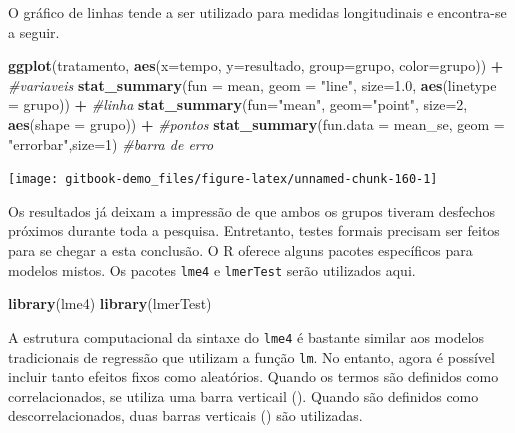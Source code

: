 \documentclass[
]{book}
\newenvironment{Shaded}{\begin{snugshade}}{\end{snugshade}}
\newcommand{\CommentTok}[1]{\textcolor[rgb]{0.56,0.35,0.01}{\textit{#1}}}
\newcommand{\DataTypeTok}[1]{\textcolor[rgb]{0.13,0.29,0.53}{#1}}
\newcommand{\DecValTok}[1]{\textcolor[rgb]{0.00,0.00,0.81}{#1}}
\newcommand{\FloatTok}[1]{\textcolor[rgb]{0.00,0.00,0.81}{#1}}
\newcommand{\KeywordTok}[1]{\textcolor[rgb]{0.13,0.29,0.53}{\textbf{#1}}}
\newcommand{\NormalTok}[1]{#1}
\newcommand{\OperatorTok}[1]{\textcolor[rgb]{0.81,0.36,0.00}{\textbf{#1}}}
\newcommand{\StringTok}[1]{\textcolor[rgb]{0.31,0.60,0.02}{#1}}
\begin{document}
O gráfico de linhas tende a ser utilizado para medidas longitudinais e encontra-se a seguir.

\begin{Shaded}
\begin{Highlighting}[]
\KeywordTok{ggplot}\NormalTok{(tratamento, }\KeywordTok{aes}\NormalTok{(}\DataTypeTok{x=}\NormalTok{tempo, }\DataTypeTok{y=}\NormalTok{resultado, }\DataTypeTok{group=}\NormalTok{grupo, }\DataTypeTok{color=}\NormalTok{grupo)) }\OperatorTok{+}\StringTok{ }\CommentTok{#variaveis}
\StringTok{  }\KeywordTok{stat_summary}\NormalTok{(}\DataTypeTok{fun =}\NormalTok{ mean, }\DataTypeTok{geom =} \StringTok{"line"}\NormalTok{, }\DataTypeTok{size=}\FloatTok{1.0}\NormalTok{, }\KeywordTok{aes}\NormalTok{(}\DataTypeTok{linetype =}\NormalTok{ grupo)) }\OperatorTok{+}\StringTok{ }\CommentTok{#linha}
\StringTok{  }\KeywordTok{stat_summary}\NormalTok{(}\DataTypeTok{fun=}\StringTok{"mean"}\NormalTok{, }\DataTypeTok{geom=}\StringTok{"point"}\NormalTok{, }\DataTypeTok{size=}\DecValTok{2}\NormalTok{, }\KeywordTok{aes}\NormalTok{(}\DataTypeTok{shape =}\NormalTok{ grupo)) }\OperatorTok{+}\StringTok{ }\CommentTok{#pontos}
\StringTok{  }\KeywordTok{stat_summary}\NormalTok{(}\DataTypeTok{fun.data =}\NormalTok{ mean_se, }\DataTypeTok{geom =} \StringTok{"errorbar"}\NormalTok{,}\DataTypeTok{size=}\DecValTok{1}\NormalTok{) }\CommentTok{#barra de erro}
\end{Highlighting}
\end{Shaded}

\begin{center}\texttt{[image: gitbook-demo\_files/figure-latex/unnamed-chunk-160-1]} \end{center}

Os resultados já deixam a impressão de que ambos os grupos tiveram desfechos próximos durante toda a pesquisa. Entretanto, testes formais precisam ser feitos para se chegar a esta conclusão. O R oferece alguns pacotes específicos para modelos mistos. Os pacotes \texttt{lme4} e \texttt{lmerTest} serão utilizados aqui.

\begin{Shaded}
\begin{Highlighting}[]
\KeywordTok{library}\NormalTok{(lme4)}
\KeywordTok{library}\NormalTok{(lmerTest)}
\end{Highlighting}
\end{Shaded}

A estrutura computacional da sintaxe do \texttt{lme4} é bastante similar aos modelos tradicionais de regressão que utilizam a função \texttt{lm}. No entanto, agora é possível incluir tanto efeitos fixos como aleatórios. Quando os termos são definidos como correlacionados, se utiliza uma barra verticail (\textbar). Quando são definidos como descorrelacionados, duas barras verticais (\textbar\textbar) são utilizadas.
\end{document}
